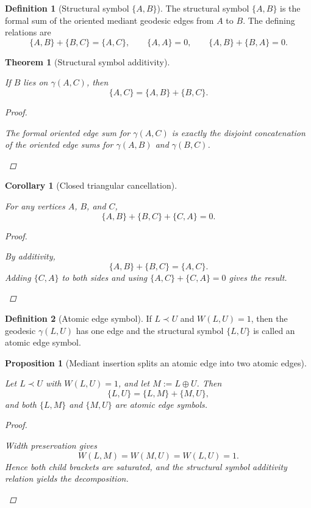 \documentclass[11pt, letterpaper]{article}
\newcommand{\med}{\oplus}
\theoremstyle{definition}
\newtheorem{definition}{Definition}[section]
\theoremstyle{plain}
\newtheorem{theorem}{Theorem}[section]
\newtheorem{proposition}{Proposition}[section]
\newtheorem{corollary}{Corollary}[section]
\begin{document}
\begin{definition}[Structural symbol $\{A,B\}$]
The structural symbol $\{A,B\}$ is the formal sum of the oriented mediant
geodesic edges from $A$ to $B$.  The defining relations are
\[
\{A,B\}+\{B,C\}=\{A,C\},
\qquad
\{A,A\}=0,
\qquad
\{A,B\}+\{B,A\}=0.
\]
\end{definition}

\begin{theorem}[Structural symbol additivity]
\begin{rsbox}
If $B$ lies on $\gamma(A,C)$, then
\[
\{A,C\}=\{A,B\}+\{B,C\}.
\]
\end{rsbox}
\begin{proof}
\begin{rsbox}
The formal oriented edge sum for $\gamma(A,C)$ is exactly the disjoint
concatenation of the oriented edge sums for $\gamma(A,B)$ and $\gamma(B,C)$.
\end{rsbox}
\end{proof}

\end{theorem}

\begin{corollary}[Closed triangular cancellation]
\begin{rsbox}
For any vertices $A$, $B$, and $C$,
\[
\{A,B\}+\{B,C\}+\{C,A\}=0.
\]
\end{rsbox}
\begin{proof}
\begin{rsbox}
By additivity,
\[
\{A,B\}+\{B,C\}=\{A,C\}.
\]
Adding $\{C,A\}$ to both sides and using $\{A,C\}+\{C,A\}=0$ gives the result.
\end{rsbox}
\end{proof}

\end{corollary}

\begin{definition}[Atomic edge symbol]
If $L\prec U$ and $W(L,U)=1$, then the geodesic $\gamma(L,U)$ has one edge and
the structural symbol $\{L,U\}$ is called an atomic edge symbol.
\end{definition}

\begin{proposition}[Mediant insertion splits an atomic edge into two atomic edges]
\begin{rsbox}
Let $L\prec U$ with $W(L,U)=1$, and let $M:=L\med U$.  Then
\[
\{L,U\}=\{L,M\}+\{M,U\},
\]
and both $\{L,M\}$ and $\{M,U\}$ are atomic edge symbols.
\end{rsbox}
\begin{proof}
\begin{rsbox}
Width preservation gives
\[
W(L,M)=W(M,U)=W(L,U)=1.
\]
Hence both child brackets are saturated, and the structural symbol additivity
relation yields the decomposition.
\end{rsbox}
\end{proof}

\end{proposition}
\end{document}
